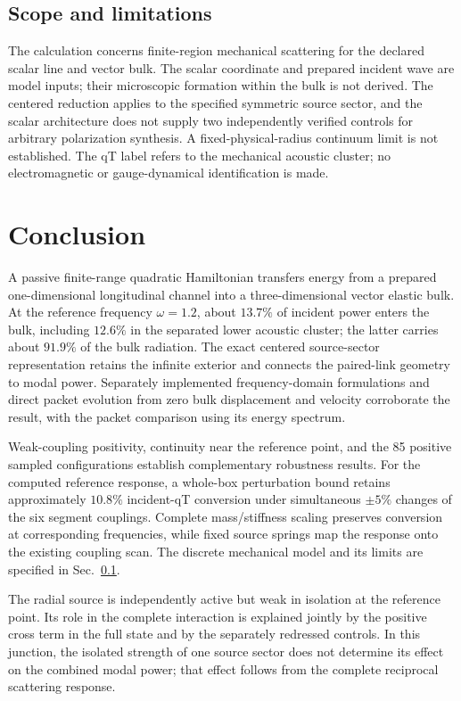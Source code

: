 \documentclass[10pt,aps,pre,reprint,floatfix,notitlepage,nofootinbib]{revtex4-2}
\begin{document}
\subsection{Scope and limitations}
\label{sec:s9-limitations}

The calculation concerns finite-region mechanical scattering for the declared scalar line and vector bulk. The scalar coordinate and prepared incident wave are model inputs; their microscopic formation within the bulk is not derived. The centered reduction applies to the specified symmetric source sector, and the scalar architecture does not supply two independently verified controls for arbitrary polarization synthesis. A fixed-physical-radius continuum limit is not established. The qT label refers to the mechanical acoustic cluster; no electromagnetic or gauge-dynamical identification is made.

\section{Conclusion}
\label{sec:conclusion}

A passive finite-range quadratic Hamiltonian transfers energy from a prepared one-dimensional longitudinal channel into a three-dimensional vector elastic bulk. At the reference frequency $\omega=1.2$, about $13.7\%$ of incident power enters the bulk, including $12.6\%$ in the separated lower acoustic cluster; the latter carries about $91.9\%$ of the bulk radiation. The exact centered source-sector representation retains the infinite exterior and connects the paired-link geometry to modal power. Separately implemented frequency-domain formulations and direct packet evolution from zero bulk displacement and velocity corroborate the result, with the packet comparison using its energy spectrum.

Weak-coupling positivity, continuity near the reference point, and the 85 positive sampled configurations establish complementary robustness results. For the computed reference response, a whole-box perturbation bound retains approximately $10.8\%$ incident-qT conversion under simultaneous $\pm5\%$ changes of the six segment couplings. Complete mass/stiffness scaling preserves conversion at corresponding frequencies, while fixed source springs map the response onto the existing coupling scan. The discrete mechanical model and its limits are specified in Sec.~\ref{sec:s9-limitations}.

The radial source is independently active but weak in isolation at the reference point. Its role in the complete interaction is explained jointly by the positive cross term in the full state and by the separately redressed controls. In this junction, the isolated strength of one source sector does not determine its effect on the combined modal power; that effect follows from the complete reciprocal scattering response.
\end{document}
